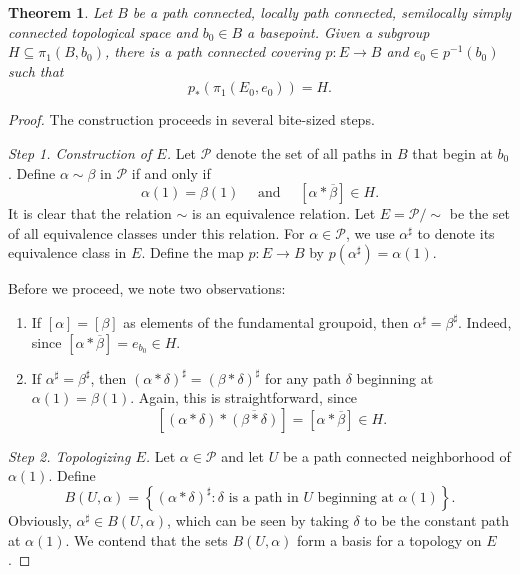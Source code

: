 \documentclass[10pt]{article}
\theoremstyle{thmstyle}
\newtheorem{theorem}{Theorem}[section]
\theoremstyle{defstyle}
\newcommand{\scrP}{\mathscr{P}}
\begin{document}
\begin{theorem}
    Let $B$ be a path connected, locally path connected, semilocally simply connected topological space and $b_0\in B$ a basepoint. Given a subgroup $H\subseteq\pi_1(B, b_0)$, there is a path connected covering $p: E\to B$ and $e_0\in p^{-1}(b_0)$ such that 
    \begin{equation*}
        p_\ast\left(\pi_1(E_0, e_0)\right) = H.
    \end{equation*}
\end{theorem}
\begin{proof}
The construction proceeds in several bite-sized steps. 

\noindent\emph{Step 1. Construction of $E$.} Let $\scrP$ denote the set of all paths in $B$ that begin at $b_0$. Define $\alpha\sim\beta$ in $\scrP$ if and only if 
\begin{equation*}
    \alpha(1) = \beta(1)\quad\text{ and }\quad [\alpha\ast\overline\beta]\in H.
\end{equation*}
It is clear that the relation $\sim$ is an equivalence relation. Let $E = \scrP/\sim$ be the set of all equivalence classes under this relation. For $\alpha\in\scrP$, we use $\alpha^\sharp$ to denote its equivalence class in $E$. Define the map $p: E\to B$ by $p(\alpha^\sharp) = \alpha(1)$.

Before we proceed, we note two observations:
\begin{enumerate}[label=(\arabic*)]
    \item If $[\alpha] = [\beta]$ as elements of the fundamental groupoid, then $\alpha^\sharp = \beta^\sharp$. Indeed, since $[\alpha\ast\overline\beta] = e_{b_0}\in H$.
    \item If $\alpha^\sharp = \beta^\sharp$, then $(\alpha\ast\delta)^\sharp = (\beta\ast\delta)^\sharp$ for any path $\delta$ beginning at $\alpha(1) = \beta(1)$. Again, this is straightforward, since 
    \begin{equation*}
        \left[(\alpha\ast\delta)\ast\overline{(\beta\ast\delta)}\right] = [\alpha\ast\overline\beta]\in H.
    \end{equation*}
\end{enumerate}

\noindent\emph{Step 2. Topologizing $E$.} Let $\alpha\in\scrP$ and let $U$ be a path connected neighborhood of $\alpha(1)$. Define 
\begin{equation*}
    B(U,\alpha) = \left\{(\alpha\ast\delta)^\sharp\colon \delta\text{ is a path in $U$ beginning at }\alpha(1)\right\}.
\end{equation*}
Obviously, $\alpha^\sharp\in B(U,\alpha)$, which can be seen by taking $\delta$ to be the constant path at $\alpha(1)$. We contend that the sets $B(U,\alpha)$ form a basis for a topology on $E$.


\end{proof}
\end{document}

